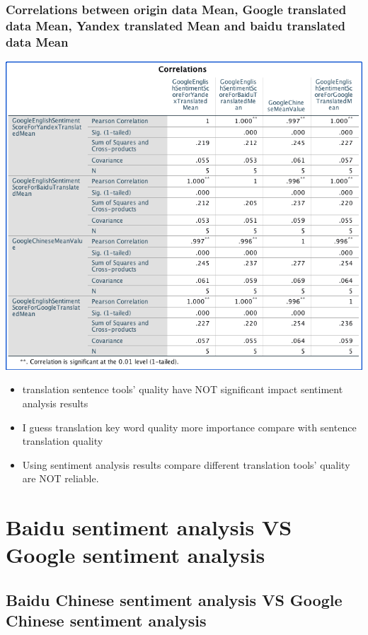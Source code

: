 \subsubsection{Correlations between origin data Mean, Google translated data Mean, Yandex translated Mean and baidu translated data Mean}
\label{sec:org35a19ce}
\begin{center}
\includegraphics[width=.9\linewidth]{./img/correlationsBetweenOriginGoogleTranslatedYandexTranslatedBaiduTranslatedMeanUsingGoogleSentiment.png}
\end{center}
\begin{itemize}
\item translation sentence tools' quality have NOT significant impact sentiment analysis results
\item I guess translation key word quality more importance compare with sentence translation quality
\item Using sentiment analysis results compare different translation tools' quality are NOT reliable.
\end{itemize}

\section{Baidu sentiment analysis VS Google sentiment analysis}
\label{sec:org70a7cb7}
\subsection{Baidu Chinese sentiment analysis VS Google Chinese sentiment analysis}
\label{sec:orgd824a64}
